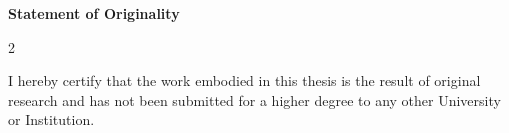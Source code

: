\begin{titlepage}

\begin{center}
\Large{\bf{Statement of Originality}}
\end{center}

\vspace{0.2in}

\begin{spacing}{2}

I hereby certify that the work embodied in this thesis is the result of original research and has not been submitted for a higher degree to any other University or Institution.

\end{spacing}

\vspace{2.5cm}

\begin{center}
	\makebox[4cm]{\dotfill}  \hfill \makebox[4cm]{\dotfill}\\
	      \hfill \makebox[4cm]{\thesisauthor}
\end{center}
\end{titlepage}
\newpage
